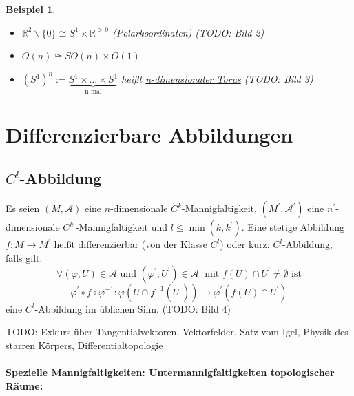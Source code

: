\documentclass[a4paper,11pt,notitlepage]{report}
\newtheorem{example}{Beispiel}[chapter]
\newcommand{\R}{{\ensuremath{\mathbb{R}}}}
\newenvironment{Kasten}[1]
{
\hspace{0.05\linewidth}
\begin{center}
\begin{minipage}{0.9\linewidth}
\setlength{\fboxsep}{10pt}
\definecolor{shadecolor}{gray}{1}
\definecolor{framecolor}{gray}{0}
\def\FrameCommand{\fcolorbox{framecolor}{shadecolor}}
\MakeFramed {\FrameRestore}
\subsection{#1}
\begin{itshape}
}
{
\end{itshape}
\endMakeFramed
\end{minipage}
\end{center}
}
\begin{document}
\begin{example}
	\begin{itemize}
		\item $\R^2 \backslash \{0\} \cong S^1 \times \R^{> 0}$ (Polarkoordinaten) (TODO: Bild 2)
		\item $O(n) \cong SO(n) \times O(1)$
		\item $(S^1)^n :=  \underbrace{S^1 \times \ldots \times S^1}_{\text{n mal}}$ heißt \underline{n-dimensionaler Torus} (TODO: Bild 3)
	\end{itemize}
\end{example}

\section{Differenzierbare Abbildungen}
\begin{Kasten}{$C^l$-Abbildung}
Es seien $(M, \mathcal{A})$ eine $n$-dimensionale $C^k$-Mannigfaltigkeit, $(M^\prime, \mathcal{A}^\prime)$ eine $n^\prime$-dimensionale $C^{k^\prime}$-Mannigfaltigkeit und $l \leq \min(k,k^\prime)$. Eine stetige Abbildung $f \colon M \rightarrow M^\prime$ heißt \underline{differenzierbar} (\underline{von der Klasse $C^l$}) oder kurz: $C^l$-Abbildung, falls gilt:
$$\forall (\varphi,U) \in \mathcal{A} \text{ und } (\varphi^\prime, U^\prime) \in \mathcal{A}^\prime \text{ mit } f(U) \cap U^\prime \neq \emptyset \text{ ist}$$
$$\boxed{\varphi^\prime \circ f \circ \varphi^{-1} \colon \varphi(U \cap f^{-1}(U^\prime)) \rightarrow \varphi^\prime(f(U)\cap U^\prime)}$$
eine $C^l$-Abbildung im üblichen Sinn.
(TODO: Bild 4)
\end{Kasten}
 
TODO: Exkurs über Tangentialvektoren, Vektorfelder, Satz vom Igel, Physik des starren Körpers, Differentialtopologie

\paragraph{
Spezielle Mannigfaltigkeiten: Untermannigfaltigkeiten topologischer Räume: }
 
\end{document}
